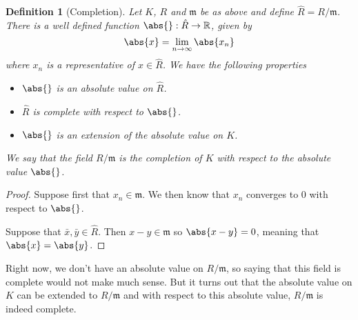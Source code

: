 \documentclass{article}
\newtheorem{definition}{Definition}[section]
\newcommand{\mfrak}[1]{\mathfrak{#1}}
\newcommand{\mbb}[1]{\mathbb{#1}}
\begin{document}
\begin{definition}[Completion]
    Let $K$, $R$ and $\mfrak m$ be as above and define $\hat R = R / \mfrak m$. There is a well defined function $\abs{} : \hat R \to \mbb R$, given by
    $$\abs{x} = \lim_{n \to \infty} \abs{x_n}$$
    where $x_n$ is a representative of $x \in \hat R$. We have the following properties
    \begin{itemize}
        \item $\abs{}$ is an absolute value on $\hat R$.
        \item $\hat R$ is complete with respect to $\abs{}$.
        \item $\abs {}$ is an extension of the absolute value on $K$.
    \end{itemize}
    We say that the field $R / \mfrak m$ is the completion of $K$ with respect to the absolute value $\abs{}$.
\end{definition}
\begin{proof}
    Suppose first that $x_n \in \mfrak m$. We then know that $x_n$ converges to 0 with respect to $\abs{}$. 
    
    Suppose that $\bar x, \bar y \in \hat R$. Then $x - y \in \mfrak m$ so $\abs{x - y} = 0$, meaning that $\abs{x} = \abs{y}$. 
\end{proof}


Right now, we don't have an absolute value on $R / \mfrak m$, so saying that this field is complete would not make much sense. But it turns out that the absolute value on $K$ can be extended to $R / \mfrak m$ and with respect to this absolute value, $R / \mfrak m$ is indeed complete.

\end{document}

